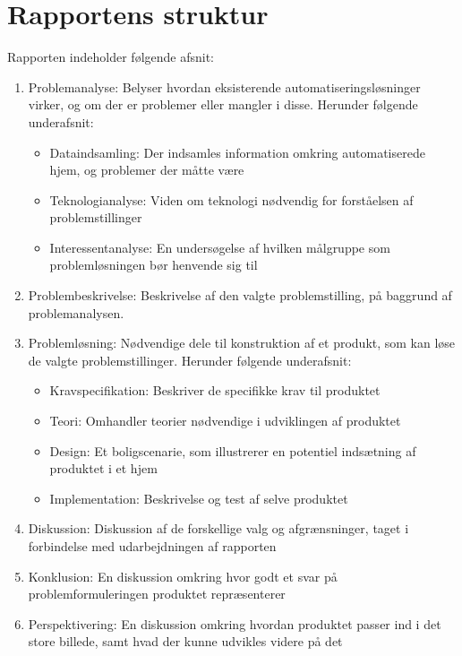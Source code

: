 \section{Rapportens struktur}
Rapporten indeholder følgende afsnit:
\begin{enumerate}
    \item Problemanalyse: Belyser hvordan eksisterende automatiseringsløsninger virker, og om der er problemer eller mangler i disse. Herunder følgende underafsnit:
    \begin{itemize}
        \item Dataindsamling: Der indsamles information omkring automatiserede hjem, og problemer der måtte være
        \item Teknologianalyse: Viden om teknologi nødvendig for forståelsen af problemstillinger
        \item Interessentanalyse: En undersøgelse af hvilken målgruppe som problemløsningen bør henvende sig til
    \end{itemize}
    \item Problembeskrivelse: Beskrivelse af den valgte problemstilling, på baggrund af problemanalysen.
    \item Problemløsning: Nødvendige dele til konstruktion af et produkt, som kan løse de valgte problemstillinger. Herunder følgende underafsnit:
    \begin{itemize}
        \item Kravspecifikation: Beskriver de specifikke krav til produktet
        \item Teori: Omhandler teorier nødvendige i udviklingen af produktet
        \item Design: Et boligscenarie, som illustrerer en potentiel indsætning af produktet i et hjem
        \item Implementation: Beskrivelse og test af selve produktet
    \end{itemize}
    \item Diskussion: Diskussion af de forskellige valg og afgrænsninger, taget i forbindelse med udarbejdningen af rapporten
    \item Konklusion: En diskussion omkring hvor godt et svar på problemformuleringen produktet repræsenterer
    \item Perspektivering: En diskussion omkring hvordan produktet passer ind i det store billede, samt hvad der kunne udvikles videre på det
\end{enumerate}